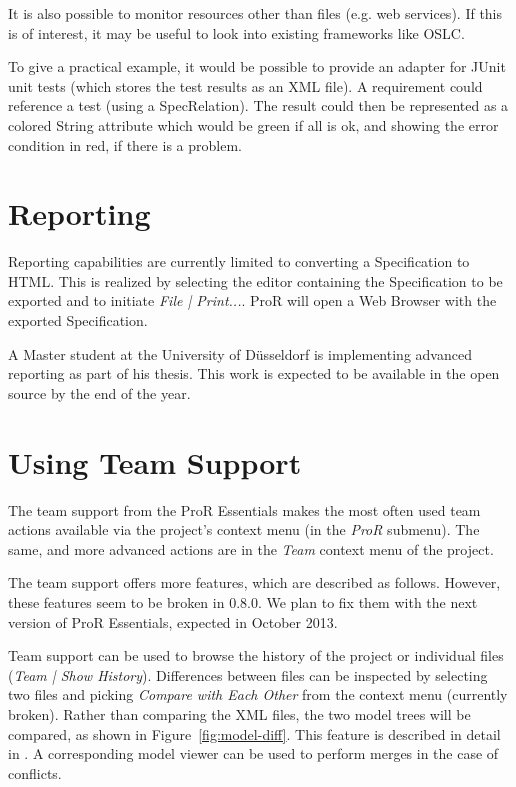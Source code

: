 \documentclass{template/openetcs_report}
\begin{document}
It is also possible to monitor resources other than files (e.g. web services).  If this is of interest, it may be useful to look into existing frameworks like OSLC.

To give a practical example, it would be possible to provide an adapter for JUnit unit tests (which stores the test results as an XML file).  A requirement could reference a test (using a SpecRelation).  The result could then be represented as a colored String attribute which would be green if all is ok, and showing the error condition in red, if there is a problem.

\section{Reporting}

Reporting capabilities are currently limited to converting a Specification to HTML.  This is realized by selecting the editor containing the Specification to be exported and to initiate \emph{File | Print...}.  ProR will open a Web Browser with the exported Specification.

A Master student at the University of Düsseldorf is implementing advanced reporting as part of his thesis.  This work is expected to be available in the open source by the end of the year.

\section{Using Team Support}

The team support from the ProR Essentials makes the most often used team actions available via the project's context menu (in the \emph{ProR} submenu).  The same, and more advanced actions are in the \emph{Team} context menu of the project.

The team support offers more features, which are described as follows.  However, these features seem to be broken in 0.8.0.  We plan to fix them with the next version of ProR Essentials, expected in October 2013.

Team support can be used to browse the history of the project or individual files (\emph{Team | Show History}).  Differences between files can be inspected by selecting two files and picking \emph{Compare with Each Other} from the context menu (currently broken).  Rather than comparing the XML files, the two model trees will be compared, as shown in Figure~\ref{fig:model-diff}.  This feature is described in detail in \cite{essentials_diff}.  A corresponding model viewer can be used to perform merges in the case of conflicts.
\end{document}
